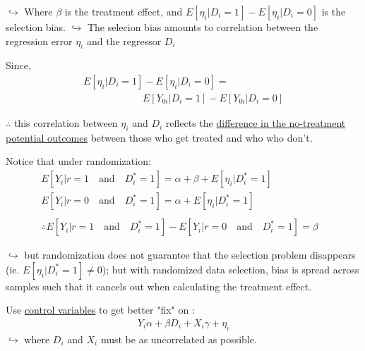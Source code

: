  $\hookrightarrow$ Where $\beta$ is the treatment effect, and $E[\eta_{i}|D_{i}=1] - E[\eta_{i}|D_{i}=0]$ is the selection bias.
\newline \indent $\hookrightarrow$ The selecion bias amounts to correlation between the regression error $\eta_{i}$ and the regressor $D_{i}$ 


\vspace{4 mm}
Since,
\begin{eqnarray}
E[\eta_{i}|D_{i}=1] - E[\eta_{i}|D_{i}=0] = \\
\qquad \qquad \qquad E[Y_{0i}|D_{i}=1] - E[Y_{0i}|D_{i}=0] 
\end{eqnarray}

\noindent $\therefore$ this correlation between $\eta_{i}$ and $D_{i}$ reflects the \underline{difference in the no-treatment potential outcomes} between those who get treated and who who don't.

\vspace{4 mm}

Notice that under randomization:
\begin{eqnarray}
E[Y_{i}|r=1 \quad \text{and} \quad D_{i}^{*}=1] = \alpha +\beta + E[\eta_{i}|D_{i}^{*}=1] \\
E[Y_{i}|r=0 \quad \text{and} \quad D_{i}^{*}=1] = \alpha + E[\eta_{i}|D_{i}^{*}=1] \qquad \\
& \nonumber \\
\therefore E[Y_{i}|r=1 \quad \text{and} \quad D_{i}^{*}=1] - E[Y_{i}|r=0 \quad \text{and} \quad D_{i}^{*}=1] = \beta
\end{eqnarray}

\noindent $\hookrightarrow$ but randomization does not guarantee that the selection problem disappears (ie. $E[\eta_{i}|D_{i}^{*}=1] \neq 0$); but with randomized data selection, bias is spread across samples such that it cancels out when calculating the treatment effect.

\vspace{4 mm}

\noindent Use \underline{control variables} to get better "fix" on \beta:
\begin{eqnarray}
Y_{i} \alpha + \beta D_{i} + X_{i}\gamma + \eta_{i} 
\end{eqnarray}
$\hookrightarrow$ where $D_{i}$ and $X_{i}$ must be as uncorrelated as possible.



